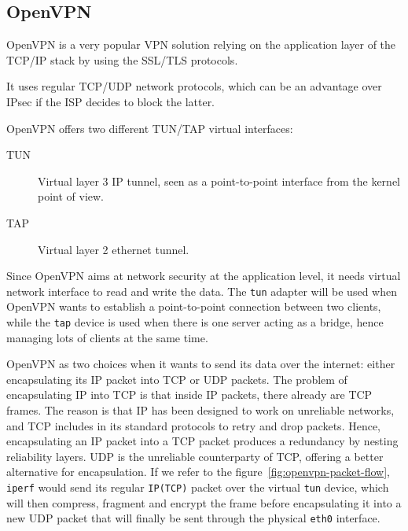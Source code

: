 \subsection{OpenVPN}
OpenVPN is a very popular VPN solution relying on the application layer of the TCP/IP stack by using the SSL/TLS protocols.

It uses regular TCP/UDP network protocols, which can be an advantage over IPsec if the ISP decides to block the latter.

OpenVPN offers two different TUN/TAP virtual interfaces:
\begin{description}
	\item[TUN] Virtual layer 3 IP tunnel, seen as a point-to-point interface from the kernel point of view.
	\item[TAP] Virtual layer 2 ethernet tunnel.
\end{description}

Since OpenVPN aims at network security at the application level, it needs virtual network interface to read and write the data.
The \texttt{tun} adapter will be used when OpenVPN wants to establish a point-to-point connection between two clients, while the \texttt{tap} device is used when there is one server acting as a bridge, hence managing lots of clients at the same time.

OpenVPN as two choices when it wants to send its data over the internet: either encapsulating its IP packet into TCP or UDP packets.
The problem of encapsulating IP into TCP is that inside IP packets, there already are TCP frames.
The reason is that IP has been designed to work on unreliable networks, and TCP includes in its standard protocols to retry and drop packets.
Hence, encapsulating an IP packet into a TCP packet produces a redundancy by nesting reliability layers.
UDP is the unreliable counterparty of TCP, offering a better alternative for encapsulation.
If we refer to the figure~\ref{fig:openvpn-packet-flow}, \texttt{iperf} would send its regular \texttt{IP(TCP)} packet over the virtual \texttt{tun} device, which will then compress, fragment and encrypt the frame before encapsulating it into a new UDP packet that will finally be sent through the physical \texttt{eth0} interface.

